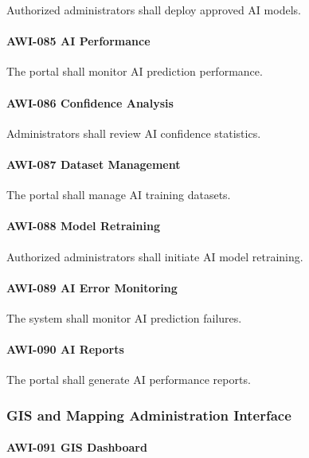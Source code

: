 Authorized administrators shall deploy approved AI models.

\paragraph{AWI-085 AI Performance}

The portal shall monitor AI prediction performance.

\paragraph{AWI-086 Confidence Analysis}

Administrators shall review AI confidence statistics.

\paragraph{AWI-087 Dataset Management}

The portal shall manage AI training datasets.

\paragraph{AWI-088 Model Retraining}

Authorized administrators shall initiate AI model retraining.

\paragraph{AWI-089 AI Error Monitoring}

The system shall monitor AI prediction failures.

\paragraph{AWI-090 AI Reports}

The portal shall generate AI performance reports.


\subsubsection*{GIS and Mapping Administration Interface}

\paragraph{AWI-091 GIS Dashboard}

